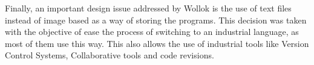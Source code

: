 Finally, an important design issue addressed by Wollok is the use of text files instead of image based as a way of storing the programs. This decision was taken with the objective of ease the process of switching to an industrial language, as most of them use this way. This also allows the use of industrial tools like Version Control Systems, Collaborative tools and code revisions.

